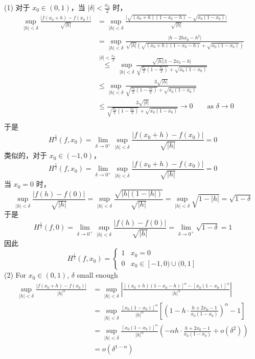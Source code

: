 (1)
对于 $x_0\in(0,1)$，当 $\lvert \delta \rvert<\frac{x_0}{2}$ 时，
\[
\begin{aligned}
 \sup_{\lvert h \rvert <\delta}\frac{\lvert f(x_0+h)-f(x_0) \rvert }{\sqrt{ \lvert h \rvert  }} 
 & =   \sup_{\lvert h \rvert <\delta}\frac{\lvert \sqrt{ (x_0+h)(1-x_0-h) }-\sqrt{ x_0(1-x_0) } \rvert }{\sqrt{ \lvert h \rvert  }} \\
 & =   \sup_{\lvert h \rvert <\delta}\frac{\lvert h-2hx_0-h^2 \rvert }{\sqrt{ \lvert h \rvert  }(\sqrt{ (x_0+h)(1-x_0-h) }+\sqrt{ x_0(1-x_0) })} \\
 & \overset{\lvert \delta \rvert <\frac{x_0}{2}  }{ \leq  } \sup_{\lvert h \rvert <\delta}\frac{\sqrt{ \lvert h \rvert  }\lvert 1-2x_0-h \rvert }{\sqrt{ \frac{x_0}{2}\left( 1-\frac{x_0}{2} \right) }+\sqrt{ x_0(1-x_0) }} \\
 & \leq \sup_{\lvert h \rvert <\delta }\frac{3\sqrt{ \lvert h \rvert  } }{\sqrt{ \frac{x_0}{2}\left( 1-\frac{x_0}{2} \right) }+\sqrt{ x_0(1-x_0) }} \\
 & \leq  \frac{3\sqrt{ \lvert \delta \rvert  } }{\sqrt{ \frac{x_0}{2}\left( 1-\frac{x_0}{2} \right) }+\sqrt{ x_0(1-x_0) }}\to0 \qquad \text{as }\delta\to0 \\
\end{aligned}
\]
于是
\[
H^{\frac{1}{2}}(f,x_0)  =\lim_{ \delta \to 0^{+} } \sup_{\lvert h \rvert <\delta}\frac{\lvert f(x_0+h)-f(x_0) \rvert }{\sqrt{ \lvert h \rvert  }} =0
\]
类似的，对于 $x_0\in(-1,0)$，
\[
H^{\frac{1}{2}}(f,x_0)  =\lim_{ \delta \to 0^{+} } \sup_{\lvert h \rvert <\delta}\frac{\lvert f(x_0+h)-f(x_0) \rvert }{\sqrt{ \lvert h \rvert  }} =0
\]
当 $x_0=0$ 时，
\[
\sup_{\lvert h \rvert <\delta}\frac{\lvert f(h)-f(0) \rvert }{\sqrt{ \lvert h \rvert  }}=\sup_{\lvert h \rvert <\delta}\frac{\sqrt{ \lvert h \rvert (1-\lvert h \rvert ) }}{\sqrt{ \lvert h \rvert  }}=\sup_{\lvert h \rvert <\delta}\sqrt{ 1-\lvert h \rvert  }=\sqrt{ 1-\delta }
\]
于是
\[
H^{\frac{1}{2}}(f,0)=\lim_{ \delta \to 0^{+} } \sup_{\lvert h \rvert <\delta}\frac{\lvert f(h) -f(0)\rvert }{\sqrt{ \lvert h \rvert  }}=\lim_{ \delta \to 0^{+} } \sqrt{ 1-\delta }=1
\]
因此
\[
H^{\frac{1}{2}}(f,x_0)=\begin{cases}
1 & x_0=0 \\
0 & x_0\in[-1,0)\cup(0,1]
\end{cases}
\]
(2)
For $x_0\in(0,1)$, $\delta$ small enough
\[
\begin{aligned}
\sup_{\lvert h \rvert <\delta}\frac{\lvert f(x_0+h)-f(x_0) \rvert }{\lvert h \rvert ^{\alpha}} & =\sup_{\lvert h \rvert <\delta}\left\lvert  \frac{[(x_0+h)(1-x_0-h)]^{\alpha}-[x_0(1-x_0)]^{\alpha}}{\lvert h \rvert ^{\alpha}}   \right\rvert \\
 & =\sup_{\lvert h \rvert <\delta}\frac{[x_0(1-x_0)]^{\alpha}}{\lvert h \rvert ^{\alpha}}\left[ \left( 1-h\cdot\frac{h+2x_0-1}{x_0(1-x_0)} \right)^{\alpha}-1 \right] \\
 & =  \sup_{\lvert h \rvert <\delta}\frac{[x_0(1-x_0)]^{\alpha}}{\lvert h \rvert ^{\alpha}}\left( -\alpha h\cdot\frac{h+2x_0-1}{x_0(1-x_0)} +o(\delta^{2})\right) \\
 & =o(\delta^{1-\alpha})
\end{aligned}
\]
